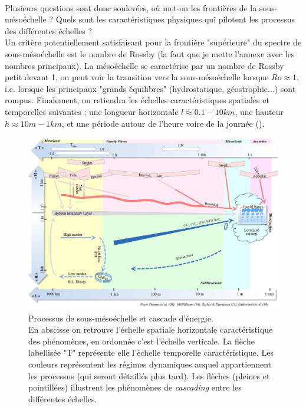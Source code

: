 \documentclass{rapportECC}
\begin{document}
\\
Plusieurs questions sont donc soulevées, où met-on les frontières de la sous-mésoéchelle ? Quels sont les caractéristiques physiques qui pilotent les processus des différentes échelles ?
\\
Un critère potentiellement satisfaisant pour la frontière "supérieure" du spectre de sous-mésoéchelle est le nombre de Rossby (la faut que je mette l'annexe avec les nombres principaux). La mésoéchelle se caractérise par un nombre de Rossby  petit devant 1, on peut voir la transition vers la sous-mésoéchelle lorsque $Ro \approx 1$, i.e. lorsque les principaux "grands équilibres" (hydrostatique, géostrophie...) sont rompus. Finalement, on retiendra les échelles caractéristiques spatiales et temporelles suivantes : une longueur horizontale $l \approx 0.1 - 10 km$, une hauteur $h \approx 10 m - 1 km$, et une période autour de l'heure voire de la journée (\cite{McWilliams_2016}).

\begin{figure}[H]
    \centering
    \includegraphics[width=1
    \textwidth]{images/SMC.jpg}
    \caption{Processus de sous-mésoéchelle et cascade d'énergie. \\
    En abscisse on retrouve l'échelle spatiale horizontale caractéristique des phénomènes, en ordonnée c'est l'échelle verticale. La flèche labellisée "T" représente elle l'échelle temporelle caractéristique. Les couleurs représentent les régimes dynamiques auquel appartiennent les processus (qui seront détaillés plus tard). Les flèches (pleines et pointillées) illustrent les phénomènes de \textit{cascading} entre les différentes échelles.}
    \label{fig:echelles}
\end{figure}
\end{document}
